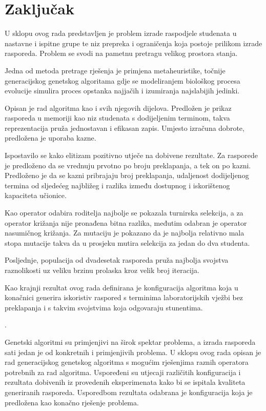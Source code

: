 \documentclass[times, utf8, zavrsni]{fer}
\begin{document}
\chapter{Zaključak}

U sklopu ovog rada predstavljen je problem izrade raspodjele studenata u nastavne i ispitne grupe te niz prepreka i ograničenja koja postoje prilikom izrade rasporeda. Problem se svodi na pametnu pretragu velikog prostora stanja.

Jedna od metoda pretrage rješenja je primjena metaheuristike, točnije generacijskog genetskog algoritama gdje se modeliranjem biološkog procesa evolucije simulira proces opstanka najjačih i izumiranja najslabijih jedinki.

Opisan je rad algoritma kao i svih njegovih dijelova. Predložen je prikaz rasporeda u memoriji kao niz studenata s dodijeljenim terminom, takva reprezentacija pruža jednostavan i efikasan zapis. Umjesto izračuna dobrote, predložena je uporaba kazne.

Ispostavilo se kako elitizam pozitivno utječe na dobivene rezultate. Za rasporede je predloženo da se vrednuju prvotno po broju preklapanja, a tek on po kazni. Predloženo je da se kazni pribrajaju broj preklapanja, udaljenost dodijeljenog termina od sljedećeg najbližeg i razlika između dostupnog i iskorištenog kapaciteta učionice.

Kao operator odabira roditelja najbolje se pokazala turnirska selekcija, a za operator križanja nije pronađena bitna razlika, međutim odabran je operator nasumičnog križanja. Za mutaciju je pokazano da je najbolja relativno mala stopa mutacije takva da u prosjeku mutira selekcija za jedan do dva studenta.

Posljednje, populacija od dvadesetak rasporeda pruža najbolja svojstva raznolikosti uz veliku brzinu prolaska kroz velik broj iteracija.

Kao krajnji rezultat ovog rada definirana je konfiguracija algoritma koja u konačnici generira iskoristiv raspored s terminima laboratorijskih vježbi bez preklapanja i s takvim svojstvima koja odgovaraju stunentima.

.


\begin{sazetak}
Genetski algoritmi su primjenjivi na širok spektar problema, a izrada rasporeda sati jedan je od konkretnih i primjenjivih problema. U sklopu ovog rada opisan je rad generacijskog genetskog algoritma s mogućim rješenjima raznih operatora potrebnih za rad algoritma. Uspoređeni su utjecaji različitih konfiguracija i rezultata dobivenih iz provedenih eksperimenata kako bi se ispitala kvaliteta generiranih rasporeda. Usporedbom rezultata odabrana je konfiguracija koja je predložena kao konačno rješenje problema.

\end{sazetak}
\end{document}
